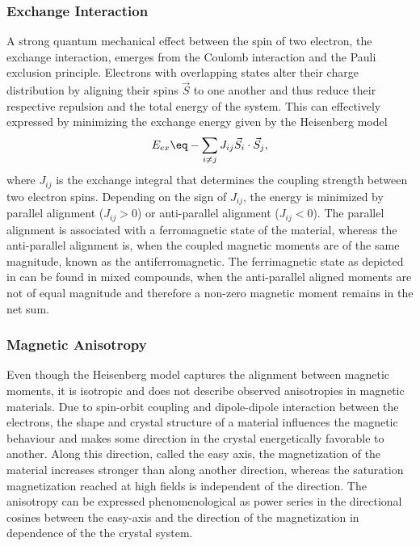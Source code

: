 \documentclass[\main/dresen_thesis.tex]{subfiles}
\begin{document}
    \subsubsection{Exchange Interaction}
      A strong quantum mechanical effect between the spin of two electron, the exchange interaction, emerges from the Coulomb interaction and the Pauli exclusion principle.
      Electrons with overlapping states alter their charge distribution by aligning their spins $\vec{S}$ to one another and thus reduce their respective repulsion and the total energy of the system.
      This can effectively expressed by minimizing the exchange energy given by the Heisenberg model
      \begin{align}
        E_{ex} \eq -\sum_{i \neq j} J_{ij} \vec{S}_i \cdot \vec{S}_j,
      \end{align}
      where $J_{ij}$ is the exchange integral that determines the coupling strength between two electron spins.
      Depending on the sign of $J_{ij}$, the energy is minimized by parallel alignment ($J_{ij} > 0$) or anti-parallel alignment ($J_{ij} < 0$).
      The parallel alignment is associated with a ferromagnetic state of the material, whereas the anti-parallel alignment is, when the coupled magnetic moments are of the same magnitude, known as the antiferromagnetic.
      The ferrimagnetic state as depicted in  can be found in mixed compounds, when the anti-parallel aligned moments are not of equal magnitude and therefore a non-zero magnetic moment remains in the net sum.

    \subsubsection{Magnetic Anisotropy}
      Even though the Heisenberg model captures the alignment between magnetic moments, it is isotropic and does not describe observed anisotropies in magnetic materials.
      Due to spin-orbit coupling and dipole-dipole interaction between the electrons, the shape and crystal structure of a material influences the magnetic behaviour and makes some direction in the crystal energetically favorable to another.
      Along this direction, called the easy axis, the magnetization of the material increases stronger than along another direction, whereas the saturation magnetization reached at high fields is independent of the direction.
      The anisotropy can be expressed phenomenological as power series in the directional cosines between the easy-axis and the direction of the magnetization in dependence of the the crystal system.
\end{document}
